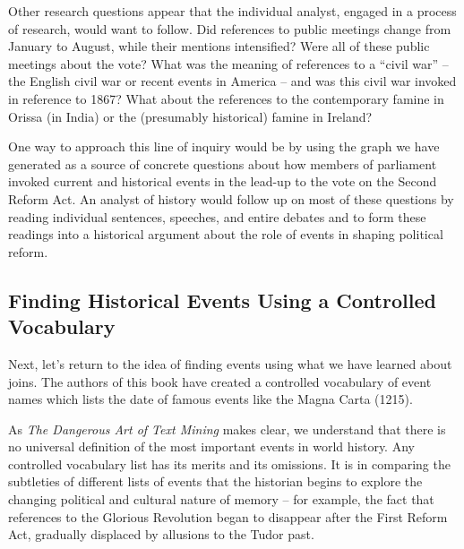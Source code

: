 \documentclass[
]{article}
\begin{document}
Other research questions appear that the individual analyst, engaged in
a process of research, would want to follow. Did references to public
meetings change from January to August, while their mentions
intensified? Were all of these public meetings about the vote? What was
the meaning of references to a ``civil war'' -- the English civil war or
recent events in America -- and was this civil war invoked in reference
to 1867? What about the references to the contemporary famine in Orissa
(in India) or the (presumably historical) famine in Ireland?

One way to approach this line of inquiry would be by using the graph we
have generated as a source of concrete questions about how members of
parliament invoked current and historical events in the lead-up to the
vote on the Second Reform Act. An analyst of history would follow up on
most of these questions by reading individual sentences, speeches, and
entire debates and to form these readings into a historical argument
about the role of events in shaping political reform.

\subsection{Finding Historical Events Using a Controlled
Vocabulary}\label{finding-historical-events-using-a-controlled-vocabulary}

Next, let's return to the idea of finding events using what we have
learned about joins. The authors of this book have created a controlled
vocabulary of event names which lists the date of famous events like the
Magna Carta (1215).

As \emph{The Dangerous Art of Text Mining} makes clear, we understand
that there is no universal definition of the most important events in
world history. Any controlled vocabulary list has its merits and its
omissions. It is in comparing the subtleties of different lists of
events that the historian begins to explore the changing political and
cultural nature of memory -- for example, the fact that references to
the Glorious Revolution began to disappear after the First Reform Act,
gradually displaced by allusions to the Tudor past.
\end{document}
